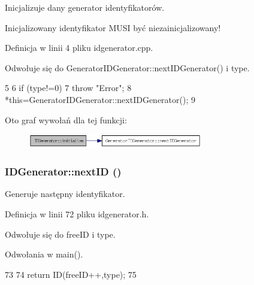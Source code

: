 Inicjalizuje dany generator identyfikatorów. 

Inicjalizowany identyfikator MUSI być niezainicjalizowany! 

Definicja w linii 4 pliku idgenerator.cpp.



Odwołuje się do GeneratorIDGenerator::nextIDGenerator() i type.




\begin{DoxyCode}
5 {
6     if (type!=0)
7         throw "Error";
8     *this=GeneratorIDGenerator::nextIDGenerator();
9 }
\end{DoxyCode}




Oto graf wywołań dla tej funkcji:\nopagebreak
\begin{figure}[H]
\begin{center}
\leavevmode
\includegraphics[width=216pt]{classIDGenerator_a16c5cba9a30dc95d05b72a1253fb54b2_cgraph}
\end{center}
\end{figure}


\hypertarget{classIDGenerator_a5e7eba106b14d8d09974bb6330476926}{
\subsubsection[{nextID}]{ IDGenerator::nextID ()}}
\label{classIDGenerator_a5e7eba106b14d8d09974bb6330476926}


Generuje następny identyfikator. 



Definicja w linii 72 pliku idgenerator.h.



Odwołuje się do freeID i type.



Odwołania w main().




\begin{DoxyCode}
73     {
74         return ID(freeID++,type);
75     }
\end{DoxyCode}





